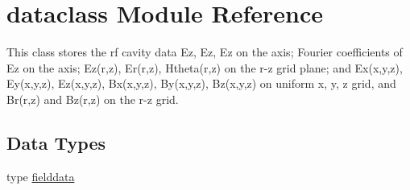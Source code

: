 \hypertarget{namespacedataclass}{}\section{dataclass Module Reference}
\label{namespacedataclass}


This class stores the rf cavity data Ez, Ez\textquotesingle{}, Ez\textquotesingle{}\textquotesingle{} on the axis; Fourier coefficients of Ez on the axis; Ez(r,z), Er(r,z), Htheta(r,z) on the r-\/z grid plane; and Ex(x,y,z), Ey(x,y,z), Ez(x,y,z), Bx(x,y,z), By(x,y,z), Bz(x,y,z) on uniform x, y, z grid, and Br(r,z) and Bz(r,z) on the r-\/z grid.  


\subsection*{Data Types}
\begin{DoxyCompactItemize}
\item 
type \mbox{\hyperlink{namespacedataclass_structdataclass_1_1fielddata}{fielddata}}
\end{DoxyCompactItemize}
